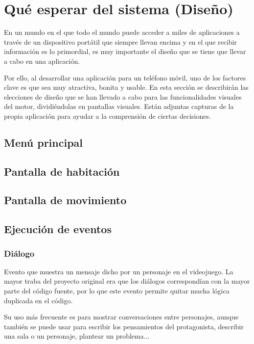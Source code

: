 \section{Qué esperar del sistema (Diseño)} \label{designSection}
En un mundo en el que todo el mundo puede acceder a miles de aplicaciones a través de un dispositivo portátil que siempre llevan encima y en el que recibir información es lo primordial, es muy importante el diseño que se tiene que llevar a cabo en una aplicación.

Por ello, al desarrollar una aplicación para un teléfono móvil, uno de los factores clave es que sea muy atractiva, bonita y usable.
En esta sección se describirán las elecciones de diseño que se han llevado a cabo para las funcionalidades visuales del motor, dividiéndolas en pantallas visuales. Están adjuntas capturas de la propia aplicación para ayudar a la comprensión de ciertas decisiones.

\subsection{Menú principal}

\subsection{Pantalla de habitación}

\subsection{Pantalla de movimiento}

\subsection{Ejecución de eventos}

\subsubsection{Diálogo}
Evento que muestra un mensaje dicho por un personaje en el videojuego. La mayor traba del proyecto original era que los diálogos correspondían con la mayor parte del código fuente, por lo que este evento permite quitar mucha lógica duplicada en el código.

Su uso más frecuente es para mostrar conversaciones entre personajes, aunque también se puede usar para escribir los pensamientos del protagonista, describir una sala o un personaje, plantear un problema...

